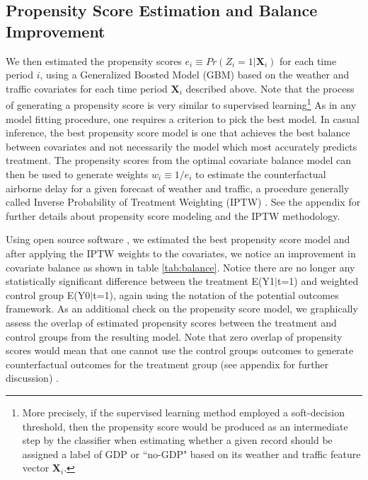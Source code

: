 \documentclass[conference]{IEEEtran}
\begin{document}
\subsection{Propensity Score Estimation and Balance Improvement}
We then estimated the propensity scores $e_i \equiv Pr(Z_i=1|\mathbf{X}_i)$ for each time period $i$, using a Generalized Boosted Model (GBM) \cite{ridgeway2015toolkit} based on the weather and traffic covariates for each time period $\mathbf{X}_i$ described above.  Note that the process of generating a propensity score is very similar to supervised learning\footnote{More precisely, if the supervised learning method employed a soft-decision threshold, then the propensity score would be produced as an intermediate step by the classifier when estimating whether a given record should be assigned a label of GDP or ``no-GDP" based on its weather and traffic feature vector $\mathbf{X}_i$.} As in any model fitting procedure, one requires a criterion to pick the best model.  In casual inference, the best propensity score model is one that achieves the best balance between covariates and not necessarily the model which most accurately predicts treatment. The propensity scores from the optimal covariate balance model can then be used to generate weights $w_i \equiv 1/e_i$ to estimate the counterfactual airborne delay for a given forecast of weather and traffic, a procedure generally called Inverse Probability of Treatment Weighting (IPTW) \cite{austin2011introduction}.  See the appendix for further details about propensity score modeling and the IPTW methodology.  

Using open source software \cite{ridgeway2015toolkit}, we estimated the best propensity score model and after applying the IPTW weights to the covariates, we notice an improvement in covariate balance as shown in table \ref{tab:balance}. Notice there are no longer any statistically significant difference between the treatment E(Y1$|$t=1) and weighted control group E(Y0$|$t=1), again using the notation of the potential outcomes framework.  As an additional check on the propensity score model, we graphically assess the overlap of estimated propensity scores between the treatment and control groups from the resulting model.  Note that zero overlap of propensity scores would mean that one cannot use the control groups outcomes to generate counterfactual outcomes for the treatment group (see appendix for further discussion) \cite{austin2011tutorial}. 
\end{document}
